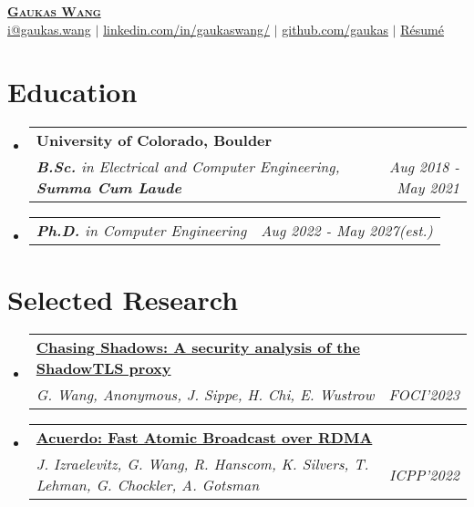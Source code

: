 \documentclass[letterpaper,11pt]{article}
\makeatletter
\newcommand{\resumeSubheading}[4]{
  \vspace{-2pt}\item
    \begin{tabular*}{0.97\textwidth}[t]{l@{\extracolsep{\fill}}r}
      \textbf{#1} & #2 \\
      \textit{\small#3} & \textit{\small #4} \\
    \end{tabular*}\vspace{-7pt}
}
\newcommand{\resumeSubSubheading}[2]{
    \item
    \begin{tabular*}{0.97\textwidth}{l@{\extracolsep{\fill}}r}
      \textit{\small#1} & \textit{\small #2} \\
    \end{tabular*}\vspace{-7pt}
}
\newcommand{\resumeProjectHeading}[2]{
    \item
    \begin{tabular*}{0.97\textwidth}{l@{\extracolsep{\fill}}r}
      \small#1 & #2 \\
    \end{tabular*}\vspace{-7pt}
}
\newcommand{\resumeSubHeadingListStart}{\begin{itemize}[leftmargin=0.15in, label={}]}
\newcommand{\resumeSubHeadingListEnd}{\end{itemize}}
\makeatother
\begin{document}
\begin{center}
  \href{https://gaukas.wang}{\textbf{\Huge \scshape Gaukas Wang}} \\ \vspace{1pt}
    \href{mailto:i@gaukas.wang}{{i@gaukas.wang}} $|$ 
    \href{https://www.linkedin.com/in/gaukaswang/}{linkedin.com/in/gaukaswang/} $|$
    \href{https://github.com/gaukas}{{github.com/gaukas}} $|$ 
    \href{https://gauk.as/resume}{{Résumé}}
    
\end{center}


\section{Education}
\resumeSubHeadingListStart
  \resumeSubheading
    {University of Colorado, Boulder}{}
    {\textbf{B.Sc.} in Electrical and Computer Engineering, \textbf{Summa Cum Laude}}{Aug 2018 - May 2021}
  \resumeSubSubheading
    {\textbf{Ph.D.} in Computer Engineering}{Aug 2022 - May 2027\textit{(est.)}}
  \resumeSubHeadingListEnd


  \vspace{1pt}

\section{Selected Research}
  \resumeSubHeadingListStart
    \resumeSubheading
      {\href{https://gaukas.wang/paper/chasing_shadows-foci23.pdf}{\textbf{Chasing Shadows: A security analysis of the ShadowTLS proxy}}}{}
      {\emph{G. Wang, Anonymous, J. Sippe, H. Chi, E. Wustrow} }{FOCI'2023}
    \resumeSubheading
      {\href{https://gaukas.wang/paper/acuerdo-icpp22.pdf}{\textbf{Acuerdo: Fast Atomic Broadcast over RDMA}}}{}
      {\emph{J. Izraelevitz, G. Wang, R. Hanscom, K. Silvers, T. Lehman, G. Chockler, A. Gotsman} }{ICPP'2022}
  \resumeSubHeadingListEnd
\end{document}

